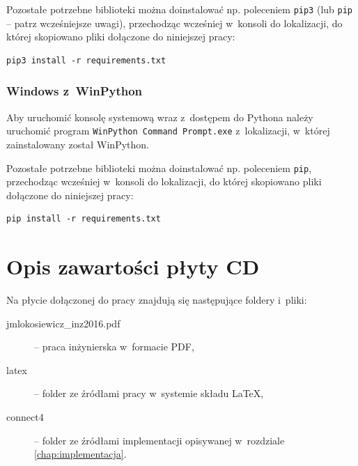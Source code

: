 \documentclass[a4paper, 12pt, oneside]{report}
\begin{document}
\begin{appendix}
Pozostałe potrzebne biblioteki można doinstalować np. poleceniem \texttt{pip3} (lub \texttt{pip} -- patrz wcześniejsze uwagi), przechodząc wcześniej w~konsoli do lokalizacji, do której skopiowano pliki dołączone do niniejszej pracy:

\begin{lstlisting}[frame=none, numbers=none]
pip3 install -r requirements.txt
\end{lstlisting}

\subsection{Windows z~WinPython}
Aby uruchomić konsolę systemową wraz z~dostępem do Pythona należy uruchomić program \texttt{WinPython Command Prompt.exe} z~lokalizacji, w~której zainstalowany został WinPython.

Pozostałe potrzebne biblioteki można doinstalować np. poleceniem \texttt{pip}, przechodząc wcześniej w~konsoli do lokalizacji, do której skopiowano pliki dołączone do niniejszej pracy:

\begin{lstlisting}[frame=none, numbers=none]
pip install -r requirements.txt
\end{lstlisting}

\chapter{Opis zawartości płyty CD}

Na płycie dołączonej do pracy znajdują się następujące foldery i~pliki:
\begin{description}
\item[jmlokosiewicz\_inz2016.pdf] -- praca inżynierska w~formacie PDF,
\item[latex] -- folder ze źródłami pracy w~systemie składu \LaTeX,
\item[connect4] -- folder ze źródłami implementacji opisywanej w~rozdziale \ref{chap:implementacja}.
\end{description}

\end{appendix}
\end{document}
